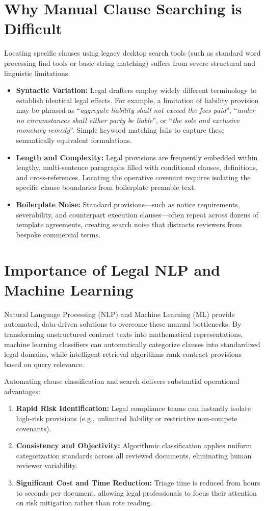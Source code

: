 \section*{Why Manual Clause Searching is Difficult}
\label{sec:manual_search_difficulties}
Locating specific clauses using legacy desktop search tools (such as standard word processing find tools or basic string matching) suffers from severe structural and linguistic limitations:
\begin{itemize}
    \item \textbf{Syntactic Variation:} Legal drafters employ widely different terminology to establish identical legal effects. For example, a limitation of liability provision may be phrased as ``\textit{aggregate liability shall not exceed the fees paid}'', ``\textit{under no circumstances shall either party be liable}'', or ``\textit{the sole and exclusive monetary remedy}''. Simple keyword matching fails to capture these semantically equivalent formulations.
    \item \textbf{Length and Complexity:} Legal provisions are frequently embedded within lengthy, multi-sentence paragraphs filled with conditional clauses, definitions, and cross-references. Locating the operative covenant requires isolating the specific clause boundaries from boilerplate preamble text.
    \item \textbf{Boilerplate Noise:} Standard provisions—such as notice requirements, severability, and counterpart execution clauses—often repeat across dozens of template agreements, creating search noise that distracts reviewers from bespoke commercial terms.
\end{itemize}

\section*{Importance of Legal NLP and Machine Learning}
\label{sec:importance_nlp_ml}
Natural Language Processing (NLP) and Machine Learning (ML) provide automated, data-driven solutions to overcome these manual bottlenecks. By transforming unstructured contract texts into mathematical representations, machine learning classifiers can automatically categorize clauses into standardized legal domains, while intelligent retrieval algorithms rank contract provisions based on query relevance.

Automating clause classification and search delivers substantial operational advantages:
\begin{enumerate}
    \item \textbf{Rapid Risk Identification:} Legal compliance teams can instantly isolate high-risk provisions (e.g., unlimited liability or restrictive non-compete covenants).
    \item \textbf{Consistency and Objectivity:} Algorithmic classification applies uniform categorization standards across all reviewed documents, eliminating human reviewer variability.
    \item \textbf{Significant Cost and Time Reduction:} Triage time is reduced from hours to seconds per document, allowing legal professionals to focus their attention on risk mitigation rather than rote reading.
\end{enumerate}


